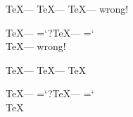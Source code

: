 \string\TeX --- %
\string\TeX --- %
\string\TeX  --- wrong!\par
{} \string\TeX --- %
\escapechar=`?\string\TeX ---
\escapechar=`\\\string\TeX  --- wrong!\par
{} \string\TeX ---
 \string\TeX ---
 \string\TeX \par
{} \string\TeX ---
\escapechar=`?\relax\string\TeX --- %
\escapechar=`\\{}\string\TeX\par%
\bye
